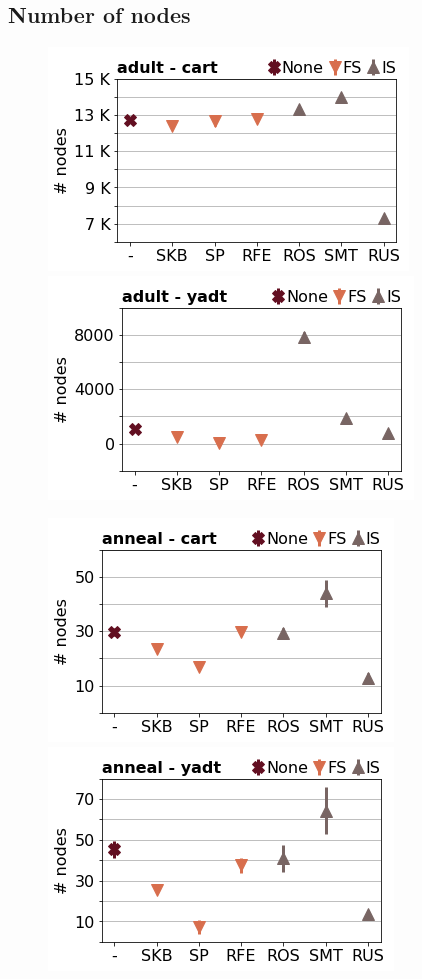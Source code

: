 \documentclass[runningheads,a4paper]{llncs}
\begin{document}
\clearpage
\subsection{Number of nodes}

\begin{figure}[!h]
\includegraphics[width=0.32\linewidth]{fig/preps_adult_DT_sklearn_nbr_nodes.png}
\includegraphics[width=0.32\linewidth]{fig/preps_adult_DT_yadt_nbr_nodes.png}
\end{figure}

\begin{figure}[!h]
\includegraphics[width=0.32\linewidth]{fig/preps_anneal_DT_sklearn_nbr_nodes.png}
\includegraphics[width=0.32\linewidth]{fig/preps_anneal_DT_yadt_nbr_nodes.png}
\end{figure}
\end{document}
